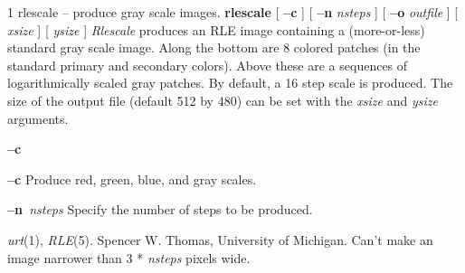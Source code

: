 %
%
%
 1
rlescale -- produce gray scale images.
{\bf rlescale}
[
{\bf --c}
] [
{\bf --n}
{\it nsteps}
] [
{\bf --o}
{\it outfile}
] [
{\it xsize}
] [
{\it ysize}
]
{\it Rlescale}
produces an RLE image containing a (more-or-less) standard gray scale
image.  Along the bottom are 8 colored patches (in the standard
primary and secondary colors).  Above these are a sequences of
logarithmically scaled gray patches.  By default, a 16 step scale is
produced.  The size of the output file (default 512 by 480) can be
set with the 
{\it xsize}
and
{\it ysize}
arguments.
\begin{TPlist}{{\bf --c}}
\item[{{\bf --c}}]
Produce red, green, blue, and gray scales.
\item[{{\bf --n}{\it \ nsteps}
}]
Specify the number of steps to be produced.
\end{TPlist}
{\it urt}{\rm (1),}
{\it RLE}{\rm (5).}
Spencer W. Thomas, University of Michigan.
Can't make an image narrower than 3 * 
{\it nsteps} 
pixels wide.
\newpage


